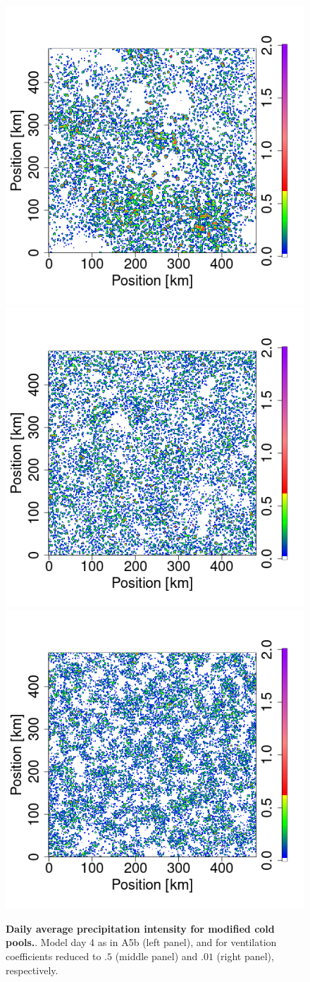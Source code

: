 \documentclass[draft,linenumbers]{agujournal2019}
\begin{document}
\begin{figure}[ht]
\centering
\includegraphics[trim={2cm 2.4cm 1cm 1cm}, clip, height=0.11\linewidth]{var1_daymean_T0_300K_ampl_10_1km_909-1176.png}
\includegraphics[trim={2cm 2.4cm 1cm 1cm}, clip, height=0.11\linewidth]{var1_daymean_T0_300K_ampl_10_1km_05vent_433-576.png}
\includegraphics[trim={2cm 2.4cm 1cm 1cm}, clip, height=0.11\linewidth]{var1_daymean_T0_300K_ampl_10_1km_001vent_433-576.png}
\caption{{\bf Daily average precipitation intensity for modified cold pools.}. 
Model day 4 as in A5b (left panel), and for ventilation coefficients reduced to $.5$ (middle panel) and $.01$ (right panel), respectively.}
\label{fig:daily_sum_vent}
\end{figure}
\end{document}

